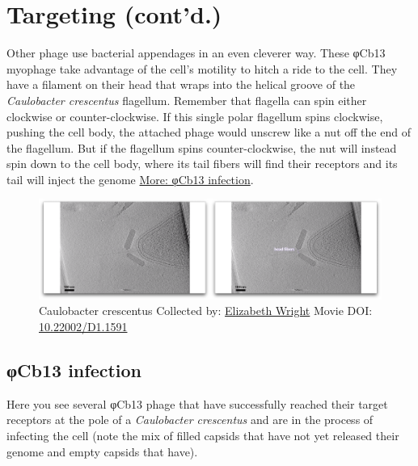 \documentclass[]{tufte-book}
\begin{document}
\section{Targeting (cont'd.)}\label{targeting-contd.}

Other phage use bacterial appendages in an even cleverer way. These
φCb13 myophage take advantage of the cell's motility to hitch a ride to
the cell. They have a filament on their head that wraps into the helical
groove of the \emph{Caulobacter crescentus} flagellum. Remember that
flagella can spin either clockwise or counter-clockwise. If this single
polar flagellum spins clockwise, pushing the cell body, the attached
phage would unscrew like a nut off the end of the flagellum. But if the
flagellum spins counter-clockwise, the nut will instead spin down to the
cell body, where its tail fibers will find their receptors and its tail
will inject the genome \protect\hyperlink{ux3c6Cb13_infection}{More:
φCb13 infection}.





\begin{figure}
\includegraphics{movie_stills/10_6} \caption[Caulobacter crescentus Collected by:
\protect\hyperlink{elizabeth_wright}{Elizabeth Wright} Movie DOI:
\href{https://doi.org/10.22002/D1.1591}{10.22002/D1.1591}]{Caulobacter crescentus Collected by:
\protect\hyperlink{elizabeth_wright}{Elizabeth Wright} Movie DOI:
\href{https://doi.org/10.22002/D1.1591}{10.22002/D1.1591}}\label{fig:10-6}
\end{figure}

\hypertarget{ux3c6Cb13_infection}{\subsection{φCb13
infection}\label{ux3c6Cb13_infection}}

Here you see several φCb13 phage that have successfully reached their
target receptors at the pole of a \emph{Caulobacter crescentus} and are
in the process of infecting the cell (note the mix of filled capsids
that have not yet released their genome and empty capsids that have).
\end{document}
